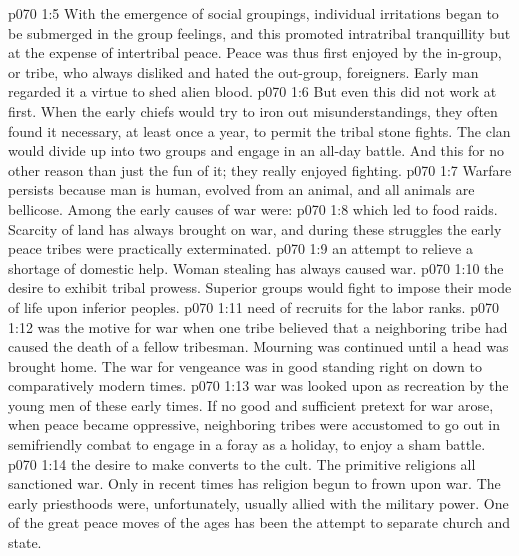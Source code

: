 \vs p070 1:5 With the emergence of social groupings, individual irritations began to be submerged in the group feelings, and this promoted intratribal tranquillity but at the expense of intertribal peace. Peace was thus first enjoyed by the in\hyp{}group, or tribe, who always disliked and hated the out\hyp{}group, foreigners. Early man regarded it a virtue to shed alien blood.
\vs p070 1:6 But even this did not work at first. When the early chiefs would try to iron out misunderstandings, they often found it necessary, at least once a year, to permit the tribal stone fights. The clan would divide up into two groups and engage in an all\hyp{}day battle. And this for no other reason than just the fun of it; they really enjoyed fighting.
\vs p070 1:7 \pc Warfare persists because man is human, evolved from an animal, and all animals are bellicose. Among the early causes of war were:
\vs p070 1:8 \bibnobreakspace {} which led to food raids. Scarcity of land has always brought on war, and during these struggles the early peace tribes were practically exterminated.
\vs p070 1:9 \pc {}\bibnobreakspace {} an attempt to relieve a shortage of domestic help. Woman stealing has always caused war.
\vs p070 1:10 \pc {}\bibnobreakspace {} the desire to exhibit tribal prowess. Superior groups would fight to impose their mode of life upon inferior peoples.
\vs p070 1:11 \pc {}\bibnobreakspace {} need of recruits for the labor ranks.
\vs p070 1:12 \pc {}\bibnobreakspace {} was the motive for war when one tribe believed that a neighboring tribe had caused the death of a fellow tribesman. Mourning was continued until a head was brought home. The war for vengeance was in good standing right on down to comparatively modern times.
\vs p070 1:13 \pc {}\bibnobreakspace {} war was looked upon as recreation by the young men of these early times. If no good and sufficient pretext for war arose, when peace became oppressive, neighboring tribes were accustomed to go out in semifriendly combat to engage in a foray as a holiday, to enjoy a sham battle.
\vs p070 1:14 \pc {}\bibnobreakspace {} the desire to make converts to the cult. The primitive religions all sanctioned war. Only in recent times has religion begun to frown upon war. The early priesthoods were, unfortunately, usually allied with the military power. One of the great peace moves of the ages has been the attempt to separate church and state.
